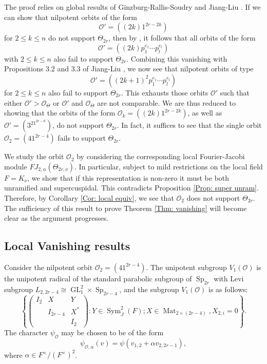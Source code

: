 \documentclass[11pt,reqno]{amsart}
\theoremstyle{definition}
\theoremstyle{remark}
\theoremstyle{definition}
\begin{document}
The proof relies on global results of Ginzburg-Rallis-Soudry \cite{GRS2} and Jiang-Liu \cite{JL2}. If we can show that nilpotent orbits of the form 
$${\mathcal{O}}'=((2k)1^{2r-2k})$$ 
for $2\leq k\leq n$ do not support $\Theta_{2r}$, then by \cite[Lemma 2.6]{GRS2} , it follows that all orbits of the form 
$${\mathcal{O}}'=((2k)p_1^{e_1}\cdots p_l^{e_l})$$
 with $2\leq k\leq n$ also fail to support $\Theta_{2r}$. Combining this vanishing with Propositions 3.2 and 3.3 of Jiang-Liu \cite{JL2}, we now see that nilpotent orbits of type 
 $${\mathcal{O}}' = ((2k+1)^2p_1^{e_1}\cdots p_l^{e_l})$$
  for $2\leq k \leq n$ also fail to support $\Theta_{2r}$. This exhausts those orbits ${\mathcal{O}}'$ such that either ${\mathcal{O}}'> {\mathcal{O}}_\Theta$ or ${\mathcal{O}}'$ and ${\mathcal{O}}_\Theta$ are not comparable. We are thus reduced to showing that the orbits of the form ${\mathcal{O}}_k=((2k)1^{2r-2k})$, as well as ${\mathcal{O}}'=(3^21^{2r-6})$, do not support $\Theta_{2r}$. In fact, it suffices to see that the single orbit ${\mathcal{O}}_2=(41^{2r-4})$ fails to support $\Theta_{2r}$.
  
  We study the orbit ${\mathcal{O}}_2$ by considering the corresponding local Fourier-Jacobi module $FJ_{2,{\alpha}}(\Theta_{2r,\nu})$. In particular, subject to mild restrictions on the local field $F=K_\nu$, we show that if this representation is non-zero it must be both unramified and supercuspidal. This contradicts Proposition \ref{Prop: super unram}. Therefore, by Corollary \ref{Cor: local equiv}, we see that ${\mathcal{O}}_2$ does not support $\Theta_{2r}$. The sufficiency of this result to prove Theorem \ref{Thm: vanishing} will become clear as the argument progresses.

\subsection{Local Vanishing results}\label{subsection: local vanishing}

Consider the nilpotent orbit ${\mathcal{O}}_2 = (41^{2r-4})$.
The unipotent subgroup $V_1({\mathcal{O}})$ is the unipotent radical of the standard parabolic subgroup of $\operatorname{Sp}_{2r}$ with Levi subgroup $L_{2,2r-4} \cong \operatorname{GL}_1^2\times \operatorname{Sp}_{2r-4}$, and the subgroup $V_1({\mathcal{O}})$ is as follows:
\[
\left\{ \left( \begin{array}{cccc}
									I_2&X&Y\\
									&I_{2r-4}&X^*\\
									&&I_2
\end{array}\right): Y\in \operatorname{Sym}_J^{2}(F); X\in \operatorname{Mat}_{2\times (2r-4)}, X_{2,i}=0 \right\}.
\]
The character $\psi_{\mathcal{O}}$ may be chosen to be of the form
\[
\psi_{{\mathcal{O}},{\alpha}}(v) = \psi(v_{1,2}+{\alpha} v_{2,2r-1}),
\]
where ${\alpha}\in F^\times/(F^\times)^2$. 
\end{document}
